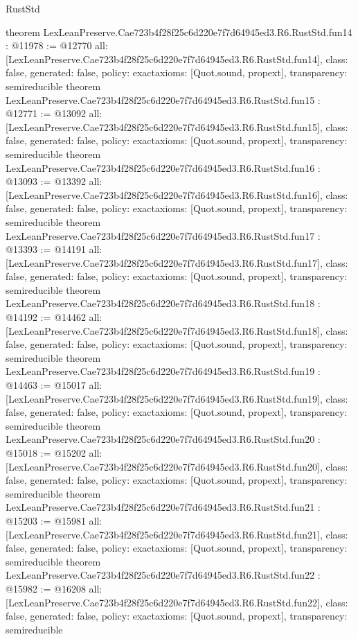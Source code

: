 \begin{lexlean}{RustStd}
\begin{coremodule}
{}
theorem LexLeanPreserve.Cae723b4f28f25c6d220e7f7d64945ed3.R6.RustStd.fun14 : @11978 := @12770 {
  all: [LexLeanPreserve.Cae723b4f28f25c6d220e7f7d64945ed3.R6.RustStd.fun14],
  class: false,
  generated: false,
  policy: exact{axioms: [Quot.sound, propext]},
  transparency: semireducible
}
theorem LexLeanPreserve.Cae723b4f28f25c6d220e7f7d64945ed3.R6.RustStd.fun15 : @12771 := @13092 {
  all: [LexLeanPreserve.Cae723b4f28f25c6d220e7f7d64945ed3.R6.RustStd.fun15],
  class: false,
  generated: false,
  policy: exact{axioms: [Quot.sound, propext]},
  transparency: semireducible
}
theorem LexLeanPreserve.Cae723b4f28f25c6d220e7f7d64945ed3.R6.RustStd.fun16 : @13093 := @13392 {
  all: [LexLeanPreserve.Cae723b4f28f25c6d220e7f7d64945ed3.R6.RustStd.fun16],
  class: false,
  generated: false,
  policy: exact{axioms: [Quot.sound, propext]},
  transparency: semireducible
}
theorem LexLeanPreserve.Cae723b4f28f25c6d220e7f7d64945ed3.R6.RustStd.fun17 : @13393 := @14191 {
  all: [LexLeanPreserve.Cae723b4f28f25c6d220e7f7d64945ed3.R6.RustStd.fun17],
  class: false,
  generated: false,
  policy: exact{axioms: [Quot.sound, propext]},
  transparency: semireducible
}
theorem LexLeanPreserve.Cae723b4f28f25c6d220e7f7d64945ed3.R6.RustStd.fun18 : @14192 := @14462 {
  all: [LexLeanPreserve.Cae723b4f28f25c6d220e7f7d64945ed3.R6.RustStd.fun18],
  class: false,
  generated: false,
  policy: exact{axioms: [Quot.sound, propext]},
  transparency: semireducible
}
theorem LexLeanPreserve.Cae723b4f28f25c6d220e7f7d64945ed3.R6.RustStd.fun19 : @14463 := @15017 {
  all: [LexLeanPreserve.Cae723b4f28f25c6d220e7f7d64945ed3.R6.RustStd.fun19],
  class: false,
  generated: false,
  policy: exact{axioms: [Quot.sound, propext]},
  transparency: semireducible
}
theorem LexLeanPreserve.Cae723b4f28f25c6d220e7f7d64945ed3.R6.RustStd.fun20 : @15018 := @15202 {
  all: [LexLeanPreserve.Cae723b4f28f25c6d220e7f7d64945ed3.R6.RustStd.fun20],
  class: false,
  generated: false,
  policy: exact{axioms: [Quot.sound, propext]},
  transparency: semireducible
}
theorem LexLeanPreserve.Cae723b4f28f25c6d220e7f7d64945ed3.R6.RustStd.fun21 : @15203 := @15981 {
  all: [LexLeanPreserve.Cae723b4f28f25c6d220e7f7d64945ed3.R6.RustStd.fun21],
  class: false,
  generated: false,
  policy: exact{axioms: [Quot.sound, propext]},
  transparency: semireducible
}
theorem LexLeanPreserve.Cae723b4f28f25c6d220e7f7d64945ed3.R6.RustStd.fun22 : @15982 := @16208 {
  all: [LexLeanPreserve.Cae723b4f28f25c6d220e7f7d64945ed3.R6.RustStd.fun22],
  class: false,
  generated: false,
  policy: exact{axioms: [Quot.sound, propext]},
  transparency: semireducible
}
\end{coremodule}
\end{lexlean}
